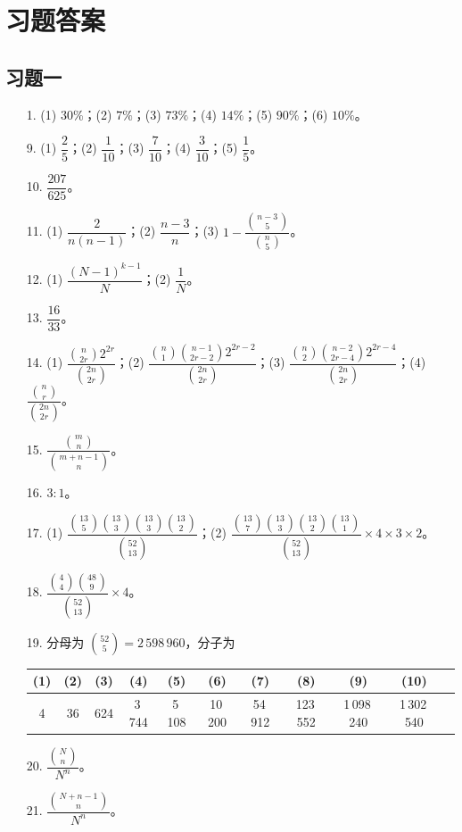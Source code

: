 \documentclass[../main.tex]{subfiles}
\begin{document}
\chapter*{习题答案}

\section*{习题一}

\begin{enumerate}
\item[1.] (1) $30\%$；(2) $7\%$；(3) $73\%$；(4) $14\%$；(5) $90\%$；(6) $10\%$。
\item[9.] (1) $\dfrac{2}{5}$；(2) $\dfrac{1}{10}$；(3) $\dfrac{7}{10}$；(4) $\dfrac{3}{10}$；(5) $\dfrac{1}{5}$。
\item[10.] $\dfrac{207}{625}$。
\item[11.] (1) $\dfrac{2}{n(n-1)}$；(2) $\dfrac{n-3}{n}$；(3) $1-\dfrac{\binom{n-3}{5}}{\binom{n}{5}}$。
\item[12.] (1) $\dfrac{(N-1)^{k-1}}{N}$；(2) $\dfrac{1}{N}$。
\item[13.] $\dfrac{16}{33}$。
\item[14.] (1) $\dfrac{\binom{n}{2r}2^{2r}}{\binom{2n}{2r}}$；(2) $\dfrac{\binom{n}{1}\binom{n-1}{2r-2}2^{2r-2}}{\binom{2n}{2r}}$；(3) $\dfrac{\binom{n}{2}\binom{n-2}{2r-4}2^{2r-4}}{\binom{2n}{2r}}$；(4) $\dfrac{\binom{n}{r}}{\binom{2n}{2r}}$。
\item[15.] $\dfrac{\binom{m}{n}}{\binom{m+n-1}{n}}$。
\item[16.] $3:1$。
\item[17.] (1) $\dfrac{\binom{13}{5}\binom{13}{3}\binom{13}{3}\binom{13}{2}}{\binom{52}{13}}$；(2) $\dfrac{\binom{13}{7}\binom{13}{3}\binom{13}{2}\binom{13}{1}}{\binom{52}{13}}\times 4\times 3\times 2$。
\item[18.] $\dfrac{\binom{4}{4}\binom{48}{9}}{\binom{52}{13}}\times 4$。
\item[19.] 分母为 $\binom{52}{5}=2\,598\,960$，分子为
\begin{center}
\begin{tabular}{c|cccccccccc}
(1)&(2)&(3)&(4)&(5)&(6)&(7)&(8)&(9)&(10)\\
\hline
4&36&624&3\,744&5\,108&10\,200&54\,912&123\,552&1\,098\,240&1\,302\,540
\end{tabular}
\end{center}
\item[20.] $\dfrac{\binom{N}{n}}{N^{n}}$。
\item[21.] $\dfrac{\binom{N+n-1}{n}}{N^{n}}$。

\end{enumerate}
\end{document}
